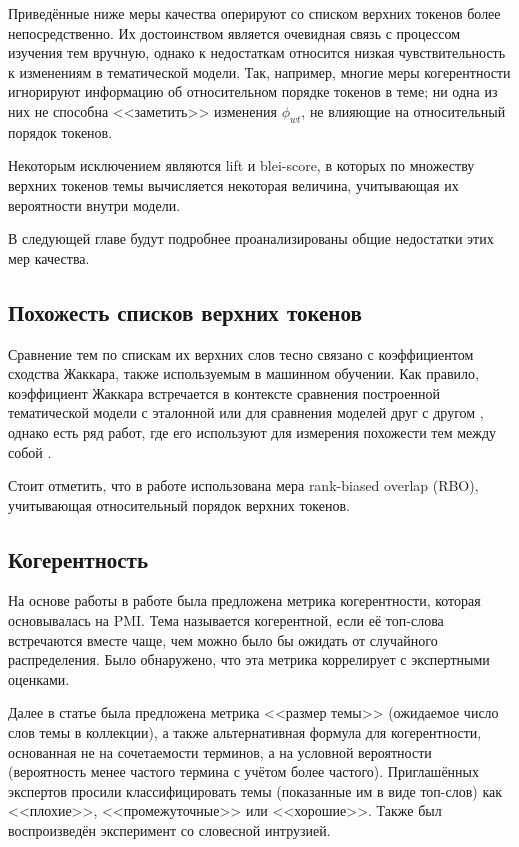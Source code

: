 Приведённые ниже меры качества оперируют со списком верхних токенов более непосредственно. Их достоинством является очевидная связь с процессом изучения тем вручную, однако к недостаткам относится низкая чувствительность к изменениям в тематической модели. Так, например, многие меры когерентности игнорируют информацию об относительном порядке токенов в теме; ни одна из них не способна <<заметить>> изменения $\phi_{wt}$, не влияющие на относительный порядок токенов.

Некоторым исключением являются lift и blei-score, в которых по множеству верхних токенов темы вычисляется некоторая величина, учитывающая их вероятности внутри модели.

В следующей главе будут подробнее проанализированы общие недостатки этих мер качества.

\subsection{Похожесть списков верхних токенов}
Сравнение тем по спискам их верхних слов тесно связано с коэффициентом сходства Жаккара, также используемым в машинном обучении. Как правило, коэффициент Жаккара встречается в контексте сравнения построенной тематической модели с эталонной \cite{greene14howmany} или для сравнения моделей друг с другом \cite{mantyla2018measuring}, однако есть ряд работ, где его используют для измерения похожести тем между собой \cite{bulatov,yanginferring}.

Стоит отметить, что в работе \cite{mantyla2018measuring} использована мера rank-biased overlap (RBO), учитывающая относительный порядок верхних токенов.

\subsection{Когерентность}
На основе работы \cite{rtl} в работе \cite{newman2010automatic} была предложена метрика когерентности, которая основывалась на PMI. Тема называется когерентной, если её топ-слова встречаются вместе чаще, чем можно было бы ожидать от случайного распределения. Было обнаружено, что эта метрика коррелирует с экспертными оценками.

Далее в статье \cite{mimno2011} была предложена метрика <<размер темы>> (ожидаемое число слов темы в коллекции), а также альтернативная формула для когерентности, основанная не на сочетаемости терминов, а на условной вероятности (вероятность менее частого термина с учётом более частого). Приглашённых экспертов просили классифицировать темы (показанные им в виде топ-слов) как <<плохие>>, <<промежуточные>> или <<хорошие>>. Также был воспроизведён эксперимент со словесной интрузией.

